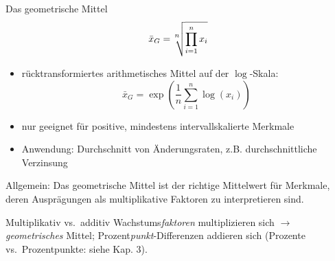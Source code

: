 \documentclass[
  10pt,
  ignorenonframetext,
]{beamer}
\providecommand{\tightlist}{%
  \setlength{\itemsep}{0pt}\setlength{\parskip}{0pt}}
\begin{document}
\begin{frame}{Das geometrische Mittel}
\protect\hypertarget{das-geometrische-mittel}{}
\begin{equation*}
      \bar x_G = \sqrt[\leftroot{2}\uproot{2} \text{\scriptsize $n$}]{\prod_{i=1}^n x_i}
\end{equation*}

\begin{itemize}
\tightlist
\item
  rücktransformiertes arithmetisches Mittel auf der \(\log\)-Skala:
  \begin{displaymath}
    \bar x_G = \exp \left(\frac{1}{n}\sum_{i=1}^{n} \log (x_{i})\right)
    \end{displaymath}
\item
  nur geeignet für positive, mindestens intervallskalierte Merkmale
\item
  Anwendung: Durchschnitt von Änderungsraten, z.B. durchschnittliche
  Verzinsung
\end{itemize}

Allgemein: Das geometrische Mittel ist der richtige Mittelwert für
Merkmale, deren Ausprägungen als multiplikative Faktoren zu
interpretieren sind.

\begin{block}{Multiplikativ vs.~additiv}
\protect\hypertarget{multiplikativ-vs.-additiv}{}
Wachstums\emph{faktoren} multiplizieren sich \(\longrightarrow\)
\emph{geometrisches} Mittel; Prozent\emph{punkt}-Differenzen addieren
sich (Prozente vs.~Prozentpunkte: siehe Kap. 3).
\end{block}
\end{frame}
\end{document}
